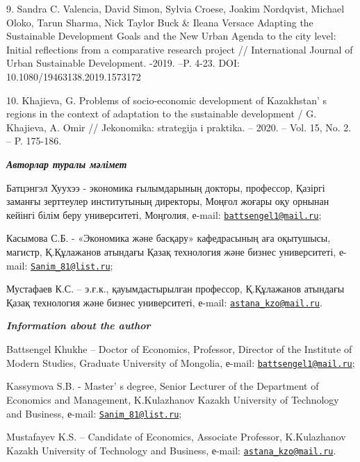 \begin{references}
9. Sandra C. Valencia, David Simon, Sylvia Croese, Joakim Nordqvist,
Michael Oloko, Tarun Sharma, Nick Taylor Buck \& Ileana Versace Adapting
the Sustainable Development Goals and the New Urban Agenda to the city
level: Initial reflections from a comparative research project //
International Journal of Urban Sustainable Development. -2019. --P.
4-23.
DOI: 10.1080/19463138.2019.1573172

10. Khajieva, G. Problems of socio-economic development of
Kazakhstan' s regions in the context of adaptation to the
sustainable development / G. Khajieva, A. Omir // Jekonomika: strategija
i praktika. -- 2020. -- Vol. 15, No. 2. -- P. 175-186.
\end{references}

\begin{authorinfo}
\hspace{1em}\emph{{\bfseries Авторлар туралы мәлімет}}

Батцэнгэл Хуухээ - экономика ғылымдарының докторы, профессор, Қазіргі
заманғы зерттеулер институтының директоры, Моңғол жоғары оқу орнынан
кейінгі білім беру университеті, Моңголия, е-mail:
\href{mailto:battsengel1@mail.ru}{\nolinkurl{battsengel1@mail.ru}};

Касымова С.Б. - «Экономика және басқару» кафедрасының аға оқытушысы,
магистр, Қ.Құлажанов атындағы Қазақ технология және бизнес университеті,
е-mail: \href{mailto:Sanim_81@list.ru}{\nolinkurl{Sanim\_81@list.ru}};

Мустафаев К.С. -- э.ғ.к., қауымдастырылған профессор, Қ.Құлажанов атындағы Қазақ
технология және бизнес университеті, е-mail:
\href{mailto:astana_kzo@mail.ru}{\nolinkurl{astana\_kzo@mail.ru}}.

\hspace{1em}\emph{{\bfseries Information about the author}}

Battsengel Khukhe -- Doctor of Economics, Professor, Director of the
Institute of Modern Studies, Graduate University of Mongolia, е-mail:
\href{mailto:battsengel1@mail.ru}{\nolinkurl{battsengel1@mail.ru}};

Kassymova S.B. - Master' s degree, Senior Lecturer of the
Department of Economics and Management, K.Kulazhanov Kazakh University
of Technology and Business, е-mail:
\href{mailto:Sanim_81@list.ru}{\nolinkurl{Sanim\_81@list.ru}};

Mustafayev K.S. -- Candidate of Economics, Associate Professor, K.Kulazhanov
Kazakh University of Technology and Business, е-mail:
\href{mailto:astana_kzo@mail.ru}{\nolinkurl{astana\_kzo@mail.ru}}.
\end{authorinfo}
